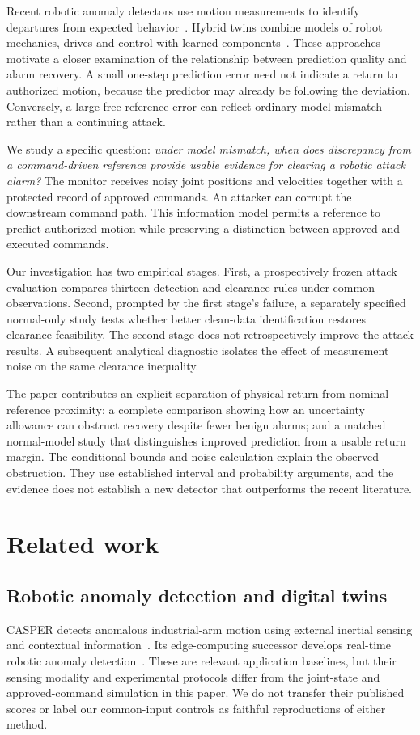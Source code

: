 \documentclass[11pt]{article}
\begin{document}
Recent robotic anomaly detectors use motion measurements to identify departures from expected behavior~\cite{casper,edge}. Hybrid twins combine models of robot mechanics, drives and control with learned components~\cite{hybrid}. These approaches motivate a closer examination of the relationship between prediction quality and alarm recovery. A small one-step prediction error need not indicate a return to authorized motion, because the predictor may already be following the deviation. Conversely, a large free-reference error can reflect ordinary model mismatch rather than a continuing attack.

We study a specific question: \emph{under model mismatch, when does discrepancy from a command-driven reference provide usable evidence for clearing a robotic attack alarm?} The monitor receives noisy joint positions and velocities together with a protected record of approved commands. An attacker can corrupt the downstream command path. This information model permits a reference to predict authorized motion while preserving a distinction between approved and executed commands.

Our investigation has two empirical stages. First, a prospectively frozen attack evaluation compares thirteen detection and clearance rules under common observations. Second, prompted by the first stage's failure, a separately specified normal-only study tests whether better clean-data identification restores clearance feasibility. The second stage does not retrospectively improve the attack results. A subsequent analytical diagnostic isolates the effect of measurement noise on the same clearance inequality.

The paper contributes an explicit separation of physical return from nominal-reference proximity; a complete comparison showing how an uncertainty allowance can obstruct recovery despite fewer benign alarms; and a matched normal-model study that distinguishes improved prediction from a usable return margin. The conditional bounds and noise calculation explain the observed obstruction. They use established interval and probability arguments, and the evidence does not establish a new detector that outperforms the recent literature.

\section{Related work}
\subsection{Robotic anomaly detection and digital twins}
CASPER detects anomalous industrial-arm motion using external inertial sensing and contextual information~\cite{casper}. Its edge-computing successor develops real-time robotic anomaly detection~\cite{edge}. These are relevant application baselines, but their sensing modality and experimental protocols differ from the joint-state and approved-command simulation in this paper. We do not transfer their published scores or label our common-input controls as faithful reproductions of either method.
\end{document}
